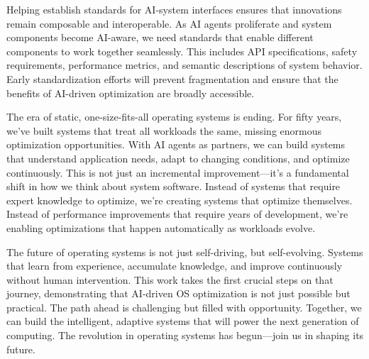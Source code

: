 Helping establish standards for AI-system interfaces ensures that innovations remain composable and interoperable. As AI agents proliferate and system components become AI-aware, we need standards that enable different components to work together seamlessly. This includes API specifications, safety requirements, performance metrics, and semantic descriptions of system behavior. Early standardization efforts will prevent fragmentation and ensure that the benefits of AI-driven optimization are broadly accessible.

The era of static, one-size-fits-all operating systems is ending. For fifty years, we've built systems that treat all workloads the same, missing enormous optimization opportunities. With AI agents as partners, we can build systems that understand application needs, adapt to changing conditions, and optimize continuously. This is not just an incremental improvement—it's a fundamental shift in how we think about system software. Instead of systems that require expert knowledge to optimize, we're creating systems that optimize themselves. Instead of performance improvements that require years of development, we're enabling optimizations that happen automatically as workloads evolve.

The future of operating systems is not just self-driving, but self-evolving. Systems that learn from experience, accumulate knowledge, and improve continuously without human intervention. This work takes the first crucial steps on that journey, demonstrating that AI-driven OS optimization is not just possible but practical. The path ahead is challenging but filled with opportunity. Together, we can build the intelligent, adaptive systems that will power the next generation of computing. The revolution in operating systems has begun—join us in shaping its future.